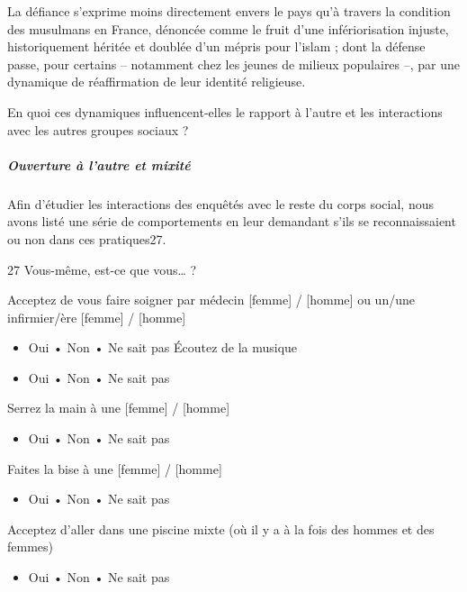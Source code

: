 La défiance s'exprime moins directement envers le pays qu'à travers la
condition des musulmans en France, dénoncée comme le fruit d'une
infériorisation injuste, historiquement héritée et doublée d'un mépris
pour l'islam ; dont la défense passe, pour certains -- notamment chez
les jeunes de milieux populaires --, par une dynamique de réaffirmation
de leur identité religieuse.

En quoi ces dynamiques influencent-elles le rapport à l'autre et les
interactions avec les autres groupes sociaux ?


\hypertarget{ouverture-uxe0-lautre-et-mixituxe9}{%
\subparagraph{Ouverture à l'autre et
mixité}\label{ouverture-uxe0-lautre-et-mixituxe9}}


Afin d'étudier les interactions des enquêtés avec le reste du corps
social, nous avons listé une série de comportements en leur demandant
s'ils se reconnaissaient ou non dans ces pratiques27.

27 Vous-même, est-ce que vous\ldots{} ?

Acceptez de vous faire soigner par médecin {[}femme{]} / {[}homme{]} ou
un/une infirmier/ère {[}femme{]} / {[}homme{]}


\begin{itemize}
\item
  Oui • Non • Ne sait pas Écoutez de la musique
\item
  
  Oui • Non • Ne sait pas
  
\end{itemize}


Serrez la main à une {[}femme{]} / {[}homme{]}


\begin{itemize}
\item
  
  Oui • Non • Ne sait pas
  
\end{itemize}


Faites la bise à une {[}femme{]} / {[}homme{]}


\begin{itemize}
\item
  
  Oui • Non • Ne sait pas
  
\end{itemize}


Acceptez d'aller dans une piscine mixte (où il y a à la fois des hommes
et des femmes)


\begin{itemize}
\item
  
  Oui • Non • Ne sait pas
  
\end{itemize}




